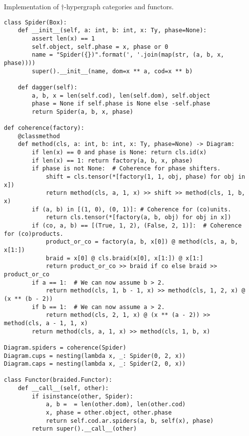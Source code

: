 \begin{python}
{\normalfont Implementation of $\dagger$-hypergraph categories and functors.}

\begin{verbatim}
class Spider(Box):
    def __init__(self, a: int, b: int, x: Ty, phase=None):
        assert len(x) == 1
        self.object, self.phase = x, phase or 0
        name = "Spider({})".format(', '.join(map(str, (a, b, x, phase))))
        super().__init__(name, dom=x ** a, cod=x ** b)

    def dagger(self):
        a, b, x = len(self.cod), len(self.dom), self.object
        phase = None if self.phase is None else -self.phase
        return Spider(a, b, x, phase)

def coherence(factory):
    @classmethod
    def method(cls, a: int, b: int, x: Ty, phase=None) -> Diagram:
        if len(x) == 0 and phase is None: return cls.id(x)
        if len(x) == 1: return factory(a, b, x, phase)
        if phase is not None:  # Coherence for phase shifters.
            shift = cls.tensor(*[factory(1, 1, obj, phase) for obj in x])
            return method(cls, a, 1, x) >> shift >> method(cls, 1, b, x)
        if (a, b) in [(1, 0), (0, 1)]: # Coherence for (co)units.
            return cls.tensor(*[factory(a, b, obj) for obj in x])
        if (co, a, b) == [(True, 1, 2), (False, 2, 1)]:  # Coherence for (co)products.
            product_or_co = factory(a, b, x[0]) @ method(cls, a, b, x[1:])
            braid = x[0] @ cls.braid(x[0], x[1:]) @ x[1:]
            return product_or_co >> braid if co else braid >> product_or_co
        if a == 1:  # We can now assume b > 2.
            return method(cls, 1, b - 1, x) >> method(cls, 1, 2, x) @ (x ** (b - 2))
        if b == 1:  # We can now assume a > 2.
            return method(cls, 2, 1, x) @ (x ** (a - 2)) >> method(cls, a - 1, 1, x)
        return method(cls, a, 1, x) >> method(cls, 1, b, x)

Diagram.spiders = coherence(Spider)
Diagram.cups = nesting(lambda x, _: Spider(0, 2, x))
Diagram.caps = nesting(lambda x, _: Spider(2, 0, x))

class Functor(braided.Functor):
    def __call__(self, other):
        if isinstance(other, Spider):
            a, b =  = len(other.dom), len(other.cod)
            x, phase = other.object, other.phase
            return self.cod.ar.spiders(a, b, self(x), phase)
        return super().__call__(other)
\end{verbatim}
\end{python}

